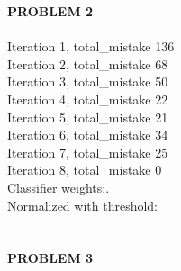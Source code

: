 \documentclass[11pt,a4paper,fleqn]{article}
\begin{document}
\newpage \noindent
\textbf{PROBLEM 2}\\ \\
Iteration 1, total\_mistake 136\\
Iteration 2, total\_mistake 68\\
Iteration 3, total\_mistake 50\\
Iteration 4, total\_mistake 22\\
Iteration 5, total\_mistake 21\\
Iteration 6, total\_mistake 34\\
Iteration 7, total\_mistake 25\\
Iteration 8, total\_mistake 0\\
Classifier weights:.\\
Normalized with threshold: \\
\\ \\
\textbf{PROBLEM 3}\\ \\
\end{document}
